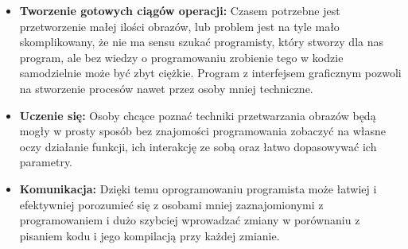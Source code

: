 \begin{itemize}
    \item \textbf{Tworzenie gotowych ciągów operacji:} Czasem potrzebne jest przetworzenie małej ilości obrazów, lub problem jest na tyle mało skomplikowany, że nie ma sensu szukać programisty, który stworzy dla nas program, ale bez wiedzy o programowaniu zrobienie tego w kodzie samodzielnie może być zbyt ciężkie. Program z interfejsem graficznym pozwoli na stworzenie procesów nawet przez osoby mniej techniczne.
    \item \textbf{Uczenie się:} Osoby chcące poznać techniki przetwarzania obrazów będą mogły w prosty sposób bez znajomości programowania zobaczyć na własne oczy działanie funkcji, ich interakcję ze sobą oraz łatwo dopasowywać ich parametry. 
    \item \textbf{Komunikacja:} Dzięki temu oprogramowaniu programista może łatwiej i efektywniej porozumieć się z osobami mniej zaznajomionymi z programowaniem i dużo szybciej wprowadzać zmiany w porównaniu z pisaniem kodu i jego kompilacją przy każdej zmianie.
\end{itemize}